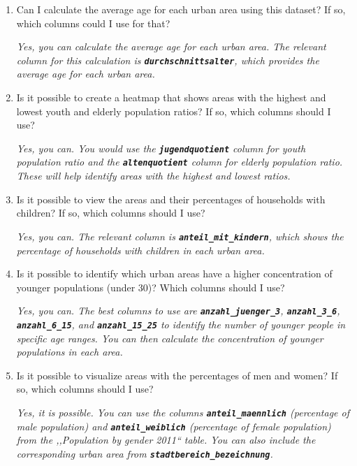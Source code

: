 \begin{enumerate}
\item Can I calculate the average age for each urban area using this dataset? If so, which columns could I use for that?

\textit{Yes, you can calculate the average age for each urban area. The relevant column for this calculation is \textbf{\texttt{durchschnittsalter}}, which provides the average age for each urban area.}

\item Is it possible to create a heatmap that shows areas with the highest and lowest youth and elderly population ratios? If so, which columns should I use?

\textit{Yes, you can. You would use the \textbf{\texttt{jugendquotient}} column for youth population ratio and the \textbf{\texttt{altenquotient}} column for elderly population ratio. These will help identify areas with the highest and lowest ratios.}

\item Is it possible to view the areas and their percentages of households with children? If so, which columns should I use?

\textit{Yes, you can. The relevant column is \textbf{\texttt{anteil\_mit\_kindern}}, which shows the percentage of households with children in each urban area.}

\item Is it possible to identify which urban areas have a higher concentration of younger populations (under 30)? Which columns should I use?

\textit{Yes, you can. The best columns to use are \textbf{\texttt{anzahl\_juenger\_3}}, \textbf{\texttt{anzahl\_3\_6}}, \textbf{\texttt{anzahl\_6\_15}}, and \textbf{\texttt{anzahl\_15\_25}} to identify the number of younger people in specific age ranges. You can then calculate the concentration of younger populations in each area.}

\item Is it possible to visualize areas with the percentages of men and women? If so, which columns should I use?

\textit{Yes, it is possible. You can use the columns \textbf{\texttt{anteil\_maennlich}} (percentage of male population) and \textbf{\texttt{anteil\_weiblich}} (percentage of female population) from the ,,Population by gender 2011`` table. You can also include the corresponding urban area from \textbf{\texttt{stadtbereich\_bezeichnung}}.}


\end{enumerate}
